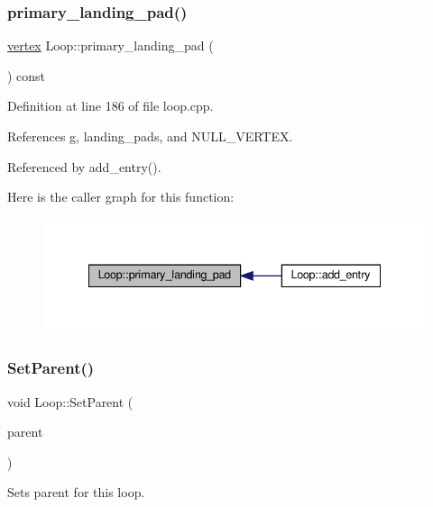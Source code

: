 \subsubsection{\texorpdfstring{primary\+\_\+landing\+\_\+pad()}{primary\_landing\_pad()}}
{\footnotesize\ttfamily \hyperlink{graph_8hpp_abefdcf0544e601805af44eca032cca14}{vertex} Loop\+::primary\+\_\+landing\+\_\+pad (\begin{DoxyParamCaption}{ }\end{DoxyParamCaption}) const}



Definition at line 186 of file loop.\+cpp.



References g, landing\+\_\+pads, and N\+U\+L\+L\+\_\+\+V\+E\+R\+T\+EX.



Referenced by add\+\_\+entry().

Here is the caller graph for this function\+:
\nopagebreak
\begin{figure}[H]
\begin{center}
\leavevmode
\includegraphics[width=335pt]{de/d77/classLoop_add98cb2caef83ae9731be70e45689607_icgraph}
\end{center}
\end{figure}
\mbox{\label{classLoop_aa25e6e6fd579f595143557de8d61f37e}} 
\subsubsection{\texorpdfstring{Set\+Parent()}{SetParent()}}
{\footnotesize\ttfamily void Loop\+::\+Set\+Parent (\begin{DoxyParamCaption}\item[{\hyperlink{loop_8hpp_aa4a60313089619376f67557c4120423c}{Loop\+Ref}}]{parent }\end{DoxyParamCaption})}



Sets parent for this loop. 


